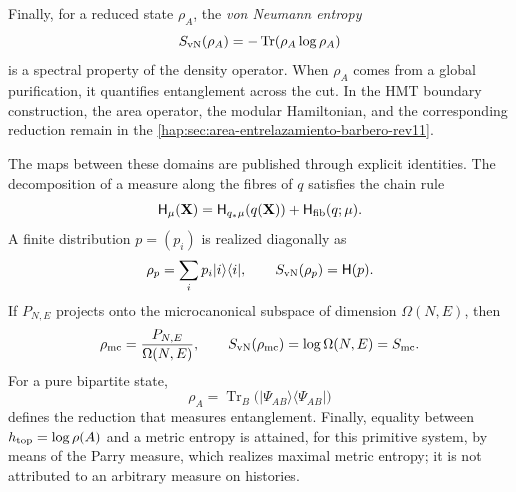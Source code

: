 Finally, for a reduced state \(\rho_A\), the \emph{von Neumann
entropy}
\[
 S_{\rm vN}(\rho_A)=-\operatorname{Tr}(\rho_A\log\rho_A)
\]
is a spectral property of the density operator. When \(\rho_A\)
comes from a global purification, it quantifies entanglement across
the cut. In the HMT boundary construction, the area operator, the
modular Hamiltonian, and the corresponding reduction remain in the
\cref{hap:sec:area-entrelazamiento-barbero-rev11}.

The maps between these domains are published through explicit identities.
The decomposition of a measure along the fibres of \(q\) satisfies the chain
rule
\begin{equation}
 \mathsf H_\mu(\mathbf X)
 =\mathsf H_{q_*\mu}(q(\mathbf X))
  +\mathsf H_{\rm fib}(q;\mu).
 \label{eq:cadena-entropia-fibras-rev2}
\end{equation}
A finite distribution \(p=(p_i)\) is realized diagonally as
\[
 \rho_p=\sum_i p_i|i\rangle\langle i|,
 \qquad S_{\rm vN}(\rho_p)=\mathsf H(p).
\]
If \(P_{N,E}\) projects onto the microcanonical subspace of dimension
\(\Omega(N,E)\), then
\[
 \rho_{\rm mc}=\frac{P_{N,E}}{\Omega(N,E)},
 \qquad S_{\rm vN}(\rho_{\rm mc})=\log\Omega(N,E)=S_{\rm mc}.
\]
For a pure bipartite state,
\[
 \rho_A=\operatorname{Tr}_B
 \bigl(|\Psi_{AB}\rangle\langle\Psi_{AB}|\bigr)
\]
defines the reduction that measures entanglement. Finally, equality between
\(h_{\rm top}=\log\rho(A)\) and a metric entropy is attained, for this
primitive system, by means of the Parry measure, which realizes maximal metric
entropy; it is not attributed to an arbitrary measure on histories.

